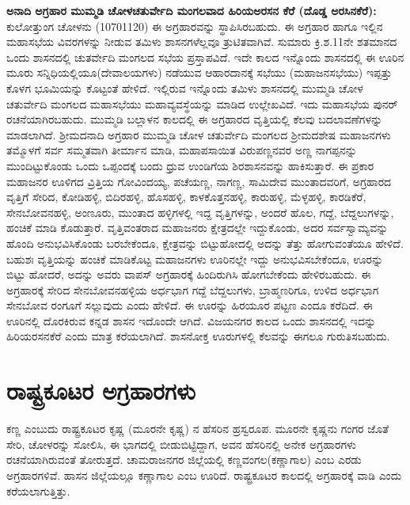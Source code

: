 \textbf{ಅನಾದಿ ಅಗ್ರಹಾರ ಮುಮ್ಮಡಿ ಚೋಳಚತುರ್ವೇದಿ ಮಂಗಲವಾದ ಹಿರಿಯಅರಸನ ಕೆರೆ (ದೊಡ್ಡ ಅರಸಿನಕೆರೆ): } ಕುಲೋತ್ತುಂಗ ಚೋಳನು (1070\enginline{-}1120) ಈ ಅಗ್ರಹಾರವನ್ನು ಸ್ಥಾಪಿಸಿರಬಹುದು. ಈ ಅಗ್ರಹಾರ ಹಾಗೂ ಇಲ್ಲಿನ ಮಹಾಸಭೆಯ ವಿವರಗಳನ್ನು ನೀಡುವ ತಮಿಳು ಶಾಸನಗಳೆಲ್ಲವೂ ತ್ರುಟಿತವಾಗಿವೆ. ಸುಮಾರು ಕ್ರಿ.ಶ.11ನೇ ಶತಮಾನದ ಒಂದು ಶಾಸನದಲ್ಲಿ ಚುತರ್ವೇದಿ ಮಂಗಲದ ಸಭೆಯ ಪ್ರಸ್ತಾಪವಿದೆ. ಇದೇ ಕಾಲದ ಇನ್ನೊಂದು ಶಾಸನದಲ್ಲಿ ಈ ಊರಿನ ಮೂರು ಸನ್ನಿಧಿಯಲ್ಲಿಯೂ(ದೇವಾಲಯಗಳು) ನಡೆಯುವ ಆಹಾರದಾನಕ್ಕೆ ಸಭೆಯು (ಮಹಾಜನಸಭೆಯು) ಇಪ್ಪತ್ತು ಕೊಳಗ ಭೂಮಿಯನ್ನು ಕೊಟ್ಟಂತೆ ಹೇಳಿದೆ. ಇಲ್ಲಿರುವ ಇನ್ನೊಂದು ತಮಿಳು ಶಾಸನದಲ್ಲಿ ಮುಮ್ಮಡಿ ಚೋಳ ಚತುರ್ವೇದಿ ಮಂಗಲದ ಮಹಾಸಭೆಯು ಮಹಾವ್ಯವಸ್ಥೆಯನ್ನು ಮಾಡಿದ ಉಲ್ಲೇಖವಿದೆ. ಇದು ಮಹಾಸಭೆಯ ಪುನರ್ ರಚನೆಯಾಗಿರಬಹುದು. ಮುಮ್ಮಡಿ ಬಲ್ಲಾಳನ ಕಾಲದಲ್ಲಿ ಈ ಅಗ್ರಹಾರದ ವೃತ್ತಿಯಲ್ಲಿ ಕೆಲವು ಬದಲಾವಣೆಗಳನ್ನು ಮಾಡಲಾಗಿದೆ. ಶ‍್ರೀಮದನಾದಿ ಅಗ್ರಹಾರ ಮುಮ್ಮಡಿ ಚೋಳ ಚತುರ್ವೇದಿ ಮಂಗಲದ ಶ‍್ರೀಮದಶೇಷ ಮಹಾಜನಗಳು ತಮ್ಮೊಳಗೆ ಸರ್ವ ಸಮ್ಮತ\-ವಾಗಿ ತೀರ್ಮಾನ ಮಾಡಿ, ಮಹಾಪಸಾಯಿತ ವಿರುಪಣ್ಣನವರ ಅಣ್ಣ ನಾಗಪ್ಪನನ್ನು ಮುಂದಿಟ್ಟುಕೊಂಡು ಒಂದು ಒಪ್ಪಂದಕ್ಕೆ ಬಂದು ಧ್ರುವ ಉಂಡಿಗೆಯ ಶಿರಶಾಸನವನ್ನು ಹಾಕಿಸುತ್ತಾರೆ. ಈ ಪ್ರಕಾರ ಮಹಾಜನರ ಊಳಿಗದ ವ್ರಿತ್ತಿಯ ಗೋವಿಂದಯ್ಯ, ಪಚೆಯಣ್ಣ, ನಾಗಣ್ಣ, ಸಾಮಿದೇವ ಮುಂತಾದವರಿಗೆ, ಅಗ್ರಹಾರದ ವೃತ್ತಿಗೆ ಸೇರಿದ, ಕೋಡಿಹಳ್ಳಿ, ಬಿದಿರಹಳ್ಳಿ, ಹೊಸಹಳ್ಳಿ, ಕಾಳಕೊತ್ತನಹಳ್ಳಿ, ಕಾರುಹಳ್ಳಿ, ಮೆಳ್ಳಹಳ್ಳಿ, ಕಾರಡಿಕೆರೆ, ಸೇನಬೋವನಹಳ್ಳಿ, ಅಂಣೂರು, ಮುಂತಾದ ಹಳ್ಳಿಗಳಲ್ಲಿ ಇದ್ದ ವೃತ್ತಿಗಳನ್ನು, ಅಂದರೆ ಹೊಲ, ಗದ್ದೆ, ಬೆದ್ದಲುಗಳನ್ನು, ಹಂಚಿಕೆ ಮಾಡಿ ಕೊಡುತ್ತಾರೆ. ವೃತ್ತಿವಂತರಾದ ಮಹಾಜನರು ಕ್ಷೇತ್ರದಲ್ಲೇ ಇದ್ದುಕೊಂಡು, ಅದರ ಸರ್ವಸ್ವಾಮ್ಯವನ್ನು ಹೊಂದಿ ಅನುಭವಿಸಿಕೊಂಡು ಬರಬೇಕೆಂದೂ, ಕ್ಷೇತ್ರವನ್ನು ಬಿಟ್ಟುಹೋದಲ್ಲಿ ಅದನ್ನು ತೆತ್ತು ಹೋಗುವಂತೆಯೂ ಹೇಳಿದೆ. ಬಹುಶಃ ವೃತ್ತಿಯನ್ನು ಹಂಚಿಕೆ ಮಾಡಿಕೊಟ್ಟ ಮಹಾಜನಗಳು ಊರಿನಲ್ಲೇ ಇದ್ದು ಅನುಭವಿಸಬೇಕೆಂದೂ, ಊರನ್ನು ಬಿಟ್ಟು ಹೋದರೆ, ಅದನ್ನು ಅವರು ವಾಪಸ್​ ಅಗ್ರಹಾರಕ್ಕೆ ಹಿಂದಿರುಗಿಸಿ ಹೋಗಬೇಕೆಂದು ಹೇಳಿರಬಹುದು. ಈ ಅಗ್ರಹಾರಕ್ಕೆ ಸೇರಿದ ಸೇನಬೋವನಹಳ್ಳಿಯ ಅರ್ಧಭಾಗ ಗದ್ದೆ ಬೆದ್ದಲುಗಳು, ಬ್ರಾಹ್ಮಣರಿಗೂ, ಉಳಿದ ಅರ್ಧಭಾಗ ಸೇನಬೋವ ರಂಗೂಗೆ ಸಲ್ಲುವುದು ಎಂದು ಹೇಳಿದೆ. ಈ ಊರನ್ನು ಹಿರಯೂರ ಪಟ್ಟಣ ಎಂದೂ ಕರೆದಿದೆ. ಈ ಊರಿನಲ್ಲಿ ದೊರಕಿರುವ ಕನ್ನಡ ಶಾಸನ ಇದೊಂದೇ ಆಗಿದೆ. ವಿಜಯನಗರ ಕಾಲದ ಒಂದು ಶಾಸನದಲ್ಲಿ ಇದನ್ನು ಹಿರಿಯರಸನಕೆರೆ ಎಂದು ಮಾತ್ರ ಕರೆಯಲಾಗಿದೆ. ಶಾಸನೋಕ್ತ ಊರುಗಳಲ್ಲಿ ಕೆಲವನ್ನು ಈಗಲೂ ಗುರುತಿಸಬಹುದು.


\section*{ರಾಷ್ಟ್ರಕೂಟರ ಅಗ್ರಹಾರಗಳು}

ಕಣ್ಣ ಎಂಬುದು ರಾಷ್ಟ್ರಕೂಟರ ಕೃಷ್ಣ (ಮೂರನೇ ಕೃಷ್ಣ) ನ ಹೆಸರಿನ ಹ್ರಸ್ವರೂಪ. ಮೂರನೇ ಕೃಷ್ಣನು ಗಂಗರ ಜೊತೆ ಸೇರಿ, ಚೋಳರನ್ನು ಸೋಲಿಸಿ, ಈ ಭಾಗದಲ್ಲಿ ಬೀಡುಬಿಟ್ಟಿದ್ದಾಗ, ಅವನ ಹೆಸರಿನಲ್ಲಿ ಅನೇಕ ಅಗ್ರಹಾರಗಳು ರಚನೆಯಾಗಿರುವಂತೆ ತೋರುತ್ತದೆ. ಚಾಮರಾಜನಗರ ಜಿಲ್ಲೆಯಲ್ಲಿ ಕಣ್ಣವಂಗಲ(ಕಣ್ಣಾಗಾಲ) ಎಂಬ ಎರಡು ಅಗ್ರಹಾರಗಳಿವೆ. ಹಾಸನ ಜಿಲ್ಲೆಯಲ್ಲೂ ಕಣ್ಣಾಗಾಲ ಎಂಬ ಊರಿದೆ. ರಾಷ್ಟ್ರಕೂಟರ ಕಾಲದಲ್ಲಿ ಅಗ್ರಹಾರಕ್ಕೆ ವಾಡಿ ಎಂದು ಕರೆಯಲಾಗುತ್ತಿತ್ತು.

